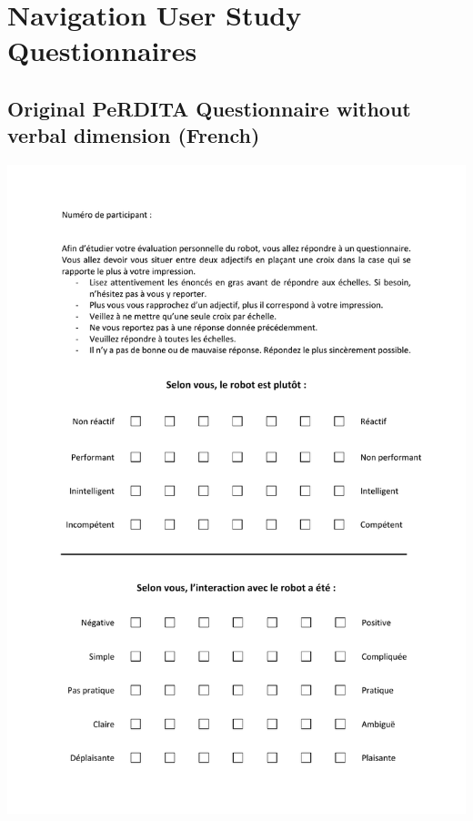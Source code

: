 \chapter{Navigation User Study Questionnaires}
\label{annex:questionnaires}
\section[PeRDITA (French)]{Original PeRDITA Questionnaire without verbal dimension (French)}
\begin{center}
\includegraphics[page=1, width=\textwidth]{Annexes/PeRDITA_vParticipant_sansDimVerbale.pdf} 
\end{center}

